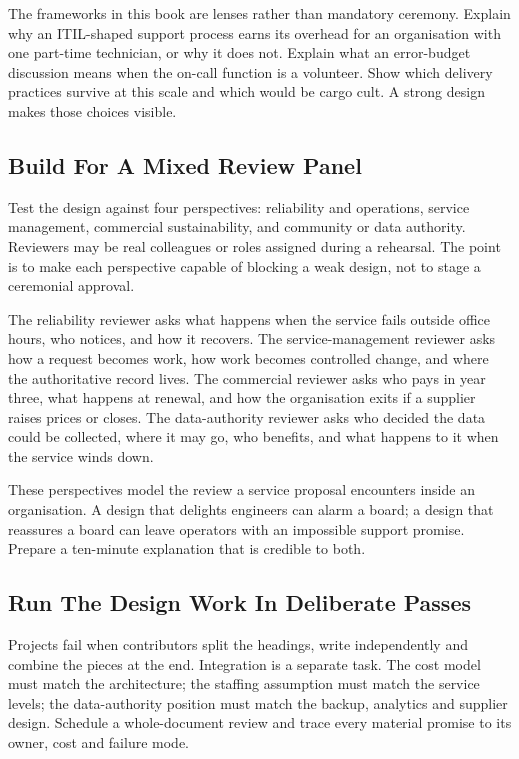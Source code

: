 The frameworks in this book are lenses rather than mandatory ceremony. Explain why an ITIL-shaped support process earns its overhead for an organisation with one part-time technician, or why it does not. Explain what an error-budget discussion means when the on-call function is a volunteer. Show which delivery practices survive at this scale and which would be cargo cult. A strong design makes those choices visible.



\subsection{Build For A Mixed Review Panel}


Test the design against four perspectives: reliability and operations, service management, commercial sustainability, and community or data authority. Reviewers may be real colleagues or roles assigned during a rehearsal. The point is to make each perspective capable of blocking a weak design, not to stage a ceremonial approval.


The reliability reviewer asks what happens when the service fails outside office hours, who notices, and how it recovers. The service-management reviewer asks how a request becomes work, how work becomes controlled change, and where the authoritative record lives. The commercial reviewer asks who pays in year three, what happens at renewal, and how the organisation exits if a supplier raises prices or closes. The data-authority reviewer asks who decided the data could be collected, where it may go, who benefits, and what happens to it when the service winds down.


These perspectives model the review a service proposal encounters inside an organisation. A design that delights engineers can alarm a board; a design that reassures a board can leave operators with an impossible support promise. Prepare a ten-minute explanation that is credible to both.



\subsection{Run The Design Work In Deliberate Passes}


Projects fail when contributors split the headings, write independently and combine the pieces at the end. Integration is a separate task. The cost model must match the architecture; the staffing assumption must match the service levels; the data-authority position must match the backup, analytics and supplier design. Schedule a whole-document review and trace every material promise to its owner, cost and failure mode.


